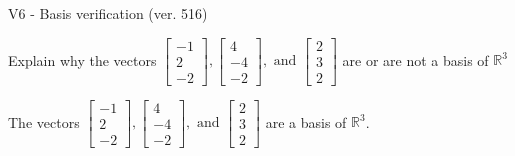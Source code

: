 \begin{exercise}
  \begin{exerciseTitle}V6 - Basis verification (ver. 516)\end{exerciseTitle}
  \begin{exerciseStatement}
    Explain why the vectors \(\left[\begin{array}{r}
-1 \\
2 \\
-2
\end{array}\right] , \left[\begin{array}{r}
4 \\
-4 \\
-2
\end{array}\right] , \text{ and } \left[\begin{array}{r}
2 \\
3 \\
2
\end{array}\right]\) are or are not a basis of \(\mathbb{R}^3\)	


  \end{exerciseStatement}
  \begin{exerciseAnswer}
   The vectors \(\left[\begin{array}{r}
-1 \\
2 \\
-2
\end{array}\right] , \left[\begin{array}{r}
4 \\
-4 \\
-2
\end{array}\right] , \text{ and } \left[\begin{array}{r}
2 \\
3 \\
2
\end{array}\right]\) 
  	 are  a basis of \(\mathbb{R}^3\).
  


  \end{exerciseAnswer}
\end{exercise}